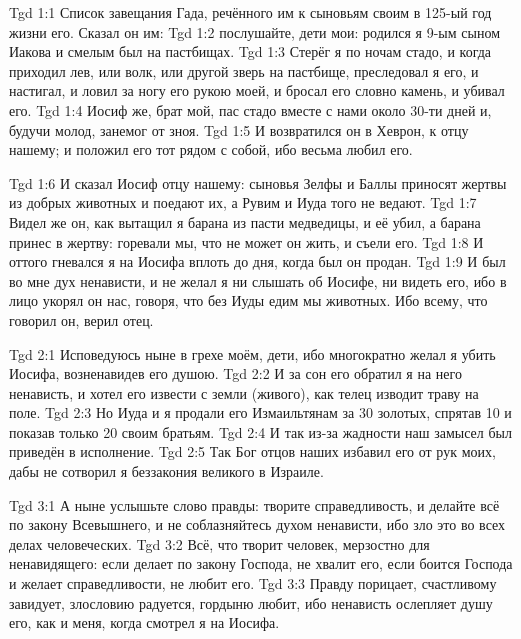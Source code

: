 \vs Tgd 1:1
Список завещания Гада,
речённого им к сыновьям своим в 125-ый год жизни его.
Сказал он им:
\vs Tgd 1:2
послушайте, дети мои:
родился я 9-ым сыном Иакова и смелым был на пастбищах.
\vs Tgd 1:3
Стерёг я по ночам стадо, и когда приходил лев,
или волк, или другой зверь на пастбище,
преследовал я его, и настигал, и ловил за ногу его рукою моей,
и бросал его словно камень, и убивал его.
\vs Tgd 1:4
Иосиф же, брат мой, пас стадо вместе с нами около 30-ти дней и,
будучи молод, занемог от зноя.
\vs Tgd 1:5
И возвратился он в Хеврон, к отцу нашему;
и положил его тот рядом с собой,
ибо весьма любил его.

\vs Tgd 1:6
И сказал Иосиф отцу нашему:
сыновья Зелфы и Баллы приносят жертвы
из добрых животных и поедают их, а Рувим и Иуда того не ведают.
\vs Tgd 1:7
Видел же он, как вытащил я барана из пасти медведицы,
и её убил, а барана принес в жертву:
горевали мы, что не может он жить, и съели его.
\vs Tgd 1:8
И оттого гневался я на Иосифа вплоть до дня, когда был он продан.
\vs Tgd 1:9
И был во мне дух ненависти, и не желал я ни слышать об Иосифе,
ни видеть его, ибо в лицо укорял он нас,
говоря, что без Иуды едим мы животных.
Ибо всему, что говорил он, верил отец.

\vs Tgd 2:1
Исповедуюсь ныне в грехе моём, дети,
ибо многократно желал я убить Иосифа, возненавидев его душою.
\vs Tgd 2:2
И за сон его обратил я на него ненависть,
и хотел его извести с земли (живого),
как телец изводит траву на поле.
\vs Tgd 2:3
Но Иуда и я продали его Измаильтянам за 30 золотых, спрятав 10 и показав
только 20 своим братьям.
\vs Tgd 2:4
И так из-за жадности наш замысел был приведён в исполнение.
\vs Tgd 2:5
Так Бог отцов наших избавил его от рук моих,
дабы не сотворил я беззакония великого в Израиле.

\vs Tgd 3:1
А ныне услышьте слово правды:
творите справедливость,
и делайте всё по закону Всевышнего, 
и не соблазняйтесь духом ненависти,
ибо зло это во всех делах человеческих.
\vs Tgd 3:2
Всё, что творит человек, мерзостно для ненавидящего:
если делает по закону Господа, не хвалит его,
если боится Господа и желает справедливости, не любит его.
\vs Tgd 3:3
Правду порицает, счастливому завидует,
злословию радуется, гордыню любит,
ибо ненависть ослепляет душу его, как и меня,
когда смотрел я на Иосифа.

